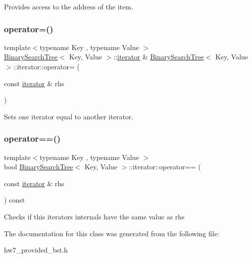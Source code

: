 Provides access to the address of the item. \mbox{\label{classBinarySearchTree_1_1iterator_a02e4ae80899345cca597757cf41a803d}} 
\subsubsection{\texorpdfstring{operator=()}{operator=()}}
{\footnotesize\ttfamily template$<$typename Key , typename Value $>$ \\
\mbox{\hyperlink{classBinarySearchTree}{Binary\+Search\+Tree}}$<$ Key, Value $>$\+::\mbox{\hyperlink{classBinarySearchTree_1_1iterator}{iterator}} \& \mbox{\hyperlink{classBinarySearchTree}{Binary\+Search\+Tree}}$<$ Key, Value $>$\+::iterator\+::operator= (\begin{DoxyParamCaption}\item[{const \mbox{\hyperlink{classBinarySearchTree_1_1iterator}{iterator}} \&}]{rhs }\end{DoxyParamCaption})}

Sets one iterator equal to another iterator. \mbox{\label{classBinarySearchTree_1_1iterator_a370e59842af3baf73b8e1ecfa4383781}} 
\subsubsection{\texorpdfstring{operator==()}{operator==()}}
{\footnotesize\ttfamily template$<$typename Key , typename Value $>$ \\
bool \mbox{\hyperlink{classBinarySearchTree}{Binary\+Search\+Tree}}$<$ Key, Value $>$\+::iterator\+::operator== (\begin{DoxyParamCaption}\item[{const \mbox{\hyperlink{classBinarySearchTree_1_1iterator}{iterator}} \&}]{rhs }\end{DoxyParamCaption}) const}

Checks if \textquotesingle{}this\textquotesingle{} iterator\textquotesingle{}s internals have the same value as \textquotesingle{}rhs\textquotesingle{} 

The documentation for this class was generated from the following file\+:\begin{DoxyCompactItemize}
\item 
hw7\+\_\+provided\+\_\+bst.\+h\end{DoxyCompactItemize}
